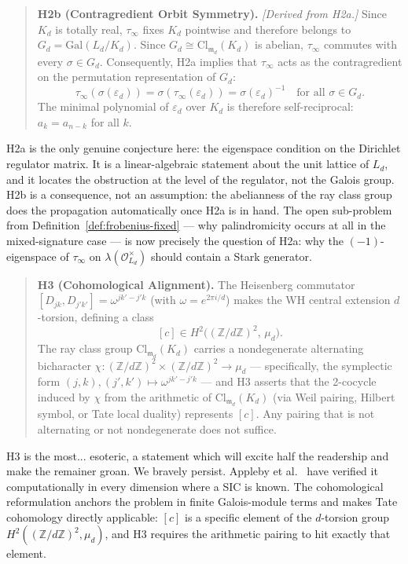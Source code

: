 \documentclass[12pt]{article}
\theoremstyle{plain}
\theoremstyle{definition}
\theoremstyle{remark}
\newcommand{\OO}{\mathcal{O}}
\newcommand{\eps}{\varepsilon}
\newcommand{\bZ}{\mathbb{Z}}
\begin{document}
\begin{quote}
\textbf{H2b (Contragredient Orbit Symmetry).} \emph{[Derived from H2a.]} Since $K_d$ is totally real, $\tau_\infty$ fixes $K_d$ pointwise and therefore belongs to $G_d = \mathrm{Gal}(L_d/K_d)$. Since $G_d \cong \mathrm{Cl}_{\mathfrak{m}_d}(K_d)$ is abelian, $\tau_\infty$ commutes with every $\sigma \in G_d$. Consequently, H2a implies that $\tau_\infty$ acts as the contragredient on the permutation representation of $G_d$:
\[
  \tau_\infty(\sigma(\eps_d)) = \sigma(\tau_\infty(\eps_d)) = \sigma(\eps_d)^{-1} \quad \text{for all } \sigma \in G_d.
\]
The minimal polynomial of $\eps_d$ over $K_d$ is therefore self-reciprocal: $a_k = a_{n-k}$ for all $k$.
\end{quote}

H2a is the only genuine conjecture here: the eigenspace condition on the Dirichlet regulator matrix. It is a linear-algebraic statement about the unit lattice of $L_d$, and it locates the obstruction at the level of the regulator, not the Galois group. H2b is a consequence, not an assumption: the abelianness of the ray class group does the propagation automatically once H2a is in hand. The open sub-problem from Definition~\ref{def:frobenius-fixed} — why palindromicity occurs at all in the mixed-signature case — is now precisely the question of H2a: why the $(-1)$-eigenspace of $\tau_\infty$ on $\lambda(\OO_{L_d}^\times)$ should contain a Stark generator.

\begin{quote}
\textbf{H3 (Cohomological Alignment).} The Heisenberg commutator $[D_{jk}, D_{j'k'}] = \omega^{jk'-j'k}$ (with $\omega = e^{2\pi i/d}$) makes the WH central extension $d$-torsion, defining a class
\[
  [c] \in H^2\!\bigl((\bZ/d\bZ)^2,\, \mu_d\bigr).
\]
The ray class group $\mathrm{Cl}_{\mathfrak{m}_d}(K_d)$ carries a nondegenerate alternating bicharacter $\chi: (\bZ/d\bZ)^2 \times (\bZ/d\bZ)^2 \to \mu_d$ — specifically, the symplectic form $(j,k),(j',k') \mapsto \omega^{jk'-j'k}$ — and H3 asserts that the 2-cocycle induced by $\chi$ from the arithmetic of $\mathrm{Cl}_{\mathfrak{m}_d}(K_d)$ (via Weil pairing, Hilbert symbol, or Tate local duality) represents $[c]$. Any pairing that is not alternating or not nondegenerate does not suffice.
\end{quote}

H3 is the most... esoteric, a statement which will excite half the readership and make the remainer groan. We bravely persist. Appleby et al.\ \cite{afmy2017} have verified it computationally in every dimension where a SIC is known. The cohomological reformulation anchors the problem in finite Galois-module terms and makes Tate cohomology directly applicable: $[c]$ is a specific element of the $d$-torsion group $H^2((\bZ/d\bZ)^2, \mu_d)$, and H3 requires the arithmetic pairing to hit exactly that element.
\end{document}
